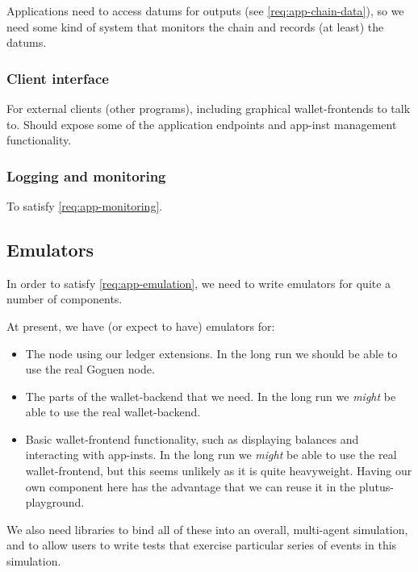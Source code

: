 \documentclass[plutus.tex]{subfiles}
\begin{document}
\subsubsection{}

Applications need to access \glspl{datum} for outputs (see \cref{req:app-chain-data}), so we need some kind of system that monitors the chain and records (at least) the \glspl{datum}.

\subsubsection{Client interface}

For external clients (other programs), including graphical \glspl{wallet-frontend} to talk to.
Should expose some of the application endpoints and \gls{app-inst} management functionality.

\subsubsection{Logging and monitoring}

To satisfy \cref{req:app-monitoring}.

\subsection{Emulators}

In order to satisfy \cref{req:app-emulation}, we need to write emulators for quite a number of components.

At present, we have (or expect to have) emulators for:
\begin{itemize}
\item
  The \gls{node} using our ledger extensions.
  In the long run we should be able to use the real Goguen \gls{node}.
\item
  The parts of the \gls{wallet-backend} that we need.
  In the long run we \emph{might} be able to use the real \gls{wallet-backend}.
\item
  Basic \gls{wallet-frontend} functionality, such as displaying balances and interacting with \glspl{app-inst}.
  In the long run we \emph{might} be able to use the real \gls{wallet-frontend}, but this seems unlikely as it is quite heavyweight.
  Having our own component here has the advantage that we can reuse it in the \gls{plutus-playground}.
\end{itemize}

We also need libraries to bind all of these into an overall, multi-agent simulation, and to allow users to write tests that exercise particular series of events in this simulation.
\end{document}
